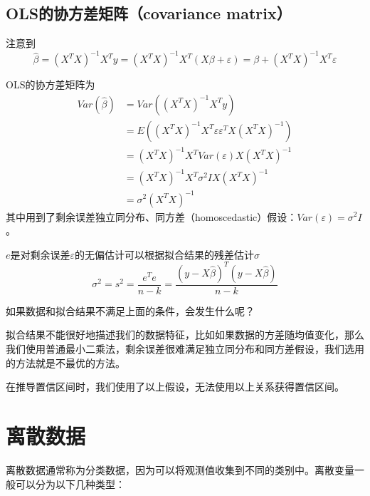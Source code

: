 \subsection{OLS的协方差矩阵（covariance matrix）}

注意到
\begin{equation}
    \hat{\beta} = (X^TX)^{-1}X^Ty = (X^TX)^{-1}X^T(X\beta + \varepsilon) = \beta + (X^TX)^{-1}X^T\varepsilon
\end{equation}

OLS的协方差矩阵为
\begin{equation}
    \begin{aligned}
        Var(\hat{\beta}) & = Var((X^TX)^{-1}X^Ty)                                  \\
                         & = E((X^TX)^{-1}X^T\varepsilon\varepsilon^TX(X^TX)^{-1}) \\
                         & = (X^TX)^{-1}X^TVar(\varepsilon)X(X^TX)^{-1}            \\
                         & = (X^TX)^{-1}X^T\sigma^2IX(X^TX)^{-1}                   \\
                         & = \sigma^2 (X^TX)^{-1}
    \end{aligned}
\end{equation}
其中用到了剩余误差独立同分布、同方差（homoscedastic）假设：$Var(\varepsilon) = \sigma^2I$。

$e$是对剩余误差$\varepsilon$的无偏估计可以根据拟合结果的残差估计$\sigma$
\begin{equation}
    \sigma^2 = s^2  = \frac{e^Te}{n-k} = \frac{(y - X\hat{\beta})^T(y - X\hat{\beta})}{n-k}
\end{equation}

\begin{note}
    如果数据和拟合结果不满足上面的条件，会发生什么呢？

    拟合结果不能很好地描述我们的数据特征，比如如果数据的方差随均值变化，那么我们使用普通最小二乘法，剩余误差很难满足独立同分布和同方差假设，我们选用的方法就是不最优的方法。

    在推导置信区间时，我们使用了以上假设，无法使用以上关系获得置信区间。
\end{note}

\section{离散数据}

离散数据通常称为分类数据，因为可以将观测值收集到不同的类别中。离散变量一般可以分为以下几种类型：

